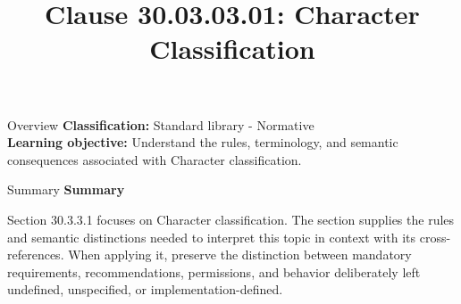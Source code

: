 \documentclass[10pt,letterpaper]{article}
\title{Clause 30.03.03.01: Character Classification}
\author{}
\date{}
\begin{document}
\maketitle
\begin{CornellOverviewBox}{Overview}
\textbf{Classification:} Standard library - Normative\\[2pt]
\textbf{Learning objective:} Understand the rules, terminology, and semantic consequences associated with Character classification.
\end{CornellOverviewBox}\begin{CornellSummaryBox}{Summary}
{\sffamily\bfseries\color{Accent} Summary}\par\vspace{3pt}Section 30.3.3.1 focuses on Character classification. The section supplies the rules and semantic distinctions needed to interpret this topic in context with its cross-references. When applying it, preserve the distinction between mandatory requirements, recommendations, permissions, and behavior deliberately left undefined, unspecified, or implementation-defined.
\end{CornellSummaryBox}
\end{document}
